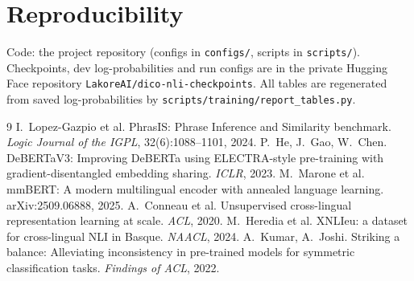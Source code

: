 \documentclass[11pt,a4paper]{article}
\begin{document}
\section{Reproducibility}
Code: the project repository (configs in \texttt{configs/}, scripts in
\texttt{scripts/}). Checkpoints, dev log-probabilities and run configs are in
the private Hugging Face repository
\texttt{LakoreAI/\allowbreak dico-nli-checkpoints}. All tables are regenerated
from saved log-probabilities by
\texttt{scripts/\allowbreak training/\allowbreak report\_tables.py}.

\begin{thebibliography}{9}
 I.~Lopez-Gazpio et al. PhrasIS: Phrase Inference and Similarity
  benchmark. \emph{Logic Journal of the IGPL}, 32(6):1088--1101, 2024.
 P.~He, J.~Gao, W.~Chen. DeBERTaV3: Improving DeBERTa using
  ELECTRA-style pre-training with gradient-disentangled embedding sharing.
  \emph{ICLR}, 2023.
 M.~Marone et al. mmBERT: A modern multilingual encoder with
  annealed language learning. arXiv:2509.06888, 2025.
 A.~Conneau et al. Unsupervised cross-lingual representation
  learning at scale. \emph{ACL}, 2020.
 M.~Heredia et al. XNLIeu: a dataset for cross-lingual NLI in
  Basque. \emph{NAACL}, 2024.
 A.~Kumar, A.~Joshi. Striking a balance: Alleviating
  inconsistency in pre-trained models for symmetric classification tasks.
  \emph{Findings of ACL}, 2022.
\end{thebibliography}
\end{document}
